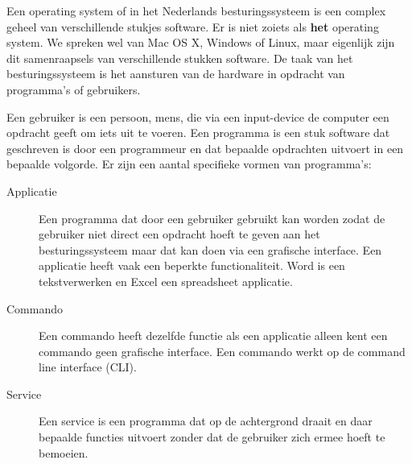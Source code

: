 Een operating system of in het Nederlands besturingssysteem is een complex geheel van verschillende stukjes software. Er is niet zoiets als \textbf{het} operating system. We spreken wel van Mac OS X, Windows of Linux, maar eigenlijk zijn dit samenraapsels van verschillende stukken software. De taak van het besturingssysteem is het aansturen van de hardware in opdracht van programma's of gebruikers.

Een gebruiker is een persoon, mens, die via een input-device de computer een opdracht geeft om iets uit te voeren. Een programma is een stuk software dat geschreven is door een programmeur en dat bepaalde opdrachten uitvoert in een bepaalde volgorde. Er zijn een aantal specifieke vormen van programma's:
\begin{description}
\item[Applicatie] Een programma dat door een gebruiker gebruikt kan worden zodat de gebruiker niet direct een opdracht hoeft te geven aan het besturingssysteem maar dat kan doen via een grafische interface. Een applicatie heeft vaak een beperkte functionaliteit. Word is een tekstverwerken en Excel een spreadsheet applicatie.
\item[Commando] Een commando heeft dezelfde functie als een applicatie alleen kent een commando geen grafische interface. Een commando werkt op de command line interface (CLI).
\item[Service] Een service is een programma dat op de achtergrond draait en daar bepaalde functies uitvoert zonder dat de gebruiker zich ermee hoeft te bemoeien.
\end{description}

